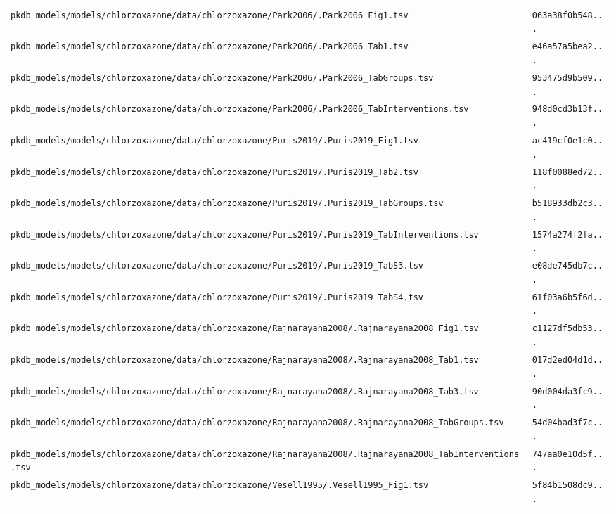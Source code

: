 \documentclass{article}
\begin{document}
\begin{longtable}{ll}
\texttt{pkdb\_models/models/chlorzoxazone/data/chlorzoxazone/Park2006/.Park2006\_Fig1.tsv} & \texttt{063a38f0b548...} \\
\texttt{pkdb\_models/models/chlorzoxazone/data/chlorzoxazone/Park2006/.Park2006\_Tab1.tsv} & \texttt{e46a57a5bea2...} \\
\texttt{pkdb\_models/models/chlorzoxazone/data/chlorzoxazone/Park2006/.Park2006\_TabGroups.tsv} & \texttt{953475d9b509...} \\
\texttt{pkdb\_models/models/chlorzoxazone/data/chlorzoxazone/Park2006/.Park2006\_TabInterventions.tsv} & \texttt{948d0cd3b13f...} \\
\texttt{pkdb\_models/models/chlorzoxazone/data/chlorzoxazone/Puris2019/.Puris2019\_Fig1.tsv} & \texttt{ac419cf0e1c0...} \\
\texttt{pkdb\_models/models/chlorzoxazone/data/chlorzoxazone/Puris2019/.Puris2019\_Tab2.tsv} & \texttt{118f0088ed72...} \\
\texttt{pkdb\_models/models/chlorzoxazone/data/chlorzoxazone/Puris2019/.Puris2019\_TabGroups.tsv} & \texttt{b518933db2c3...} \\
\texttt{pkdb\_models/models/chlorzoxazone/data/chlorzoxazone/Puris2019/.Puris2019\_TabInterventions.tsv} & \texttt{1574a274f2fa...} \\
\texttt{pkdb\_models/models/chlorzoxazone/data/chlorzoxazone/Puris2019/.Puris2019\_TabS3.tsv} & \texttt{e08de745db7c...} \\
\texttt{pkdb\_models/models/chlorzoxazone/data/chlorzoxazone/Puris2019/.Puris2019\_TabS4.tsv} & \texttt{61f03a6b5f6d...} \\
\texttt{pkdb\_models/models/chlorzoxazone/data/chlorzoxazone/Rajnarayana2008/.Rajnarayana2008\_Fig1.tsv} & \texttt{c1127df5db53...} \\
\texttt{pkdb\_models/models/chlorzoxazone/data/chlorzoxazone/Rajnarayana2008/.Rajnarayana2008\_Tab1.tsv} & \texttt{017d2ed04d1d...} \\
\texttt{pkdb\_models/models/chlorzoxazone/data/chlorzoxazone/Rajnarayana2008/.Rajnarayana2008\_Tab3.tsv} & \texttt{90d004da3fc9...} \\
\texttt{pkdb\_models/models/chlorzoxazone/data/chlorzoxazone/Rajnarayana2008/.Rajnarayana2008\_TabGroups.tsv} & \texttt{54d04bad3f7c...} \\
\texttt{pkdb\_models/models/chlorzoxazone/data/chlorzoxazone/Rajnarayana2008/.Rajnarayana2008\_TabInterventions.tsv} & \texttt{747aa0e10d5f...} \\
\texttt{pkdb\_models/models/chlorzoxazone/data/chlorzoxazone/Vesell1995/.Vesell1995\_Fig1.tsv} & \texttt{5f84b1508dc9...} \\

\end{longtable}
\end{document}
